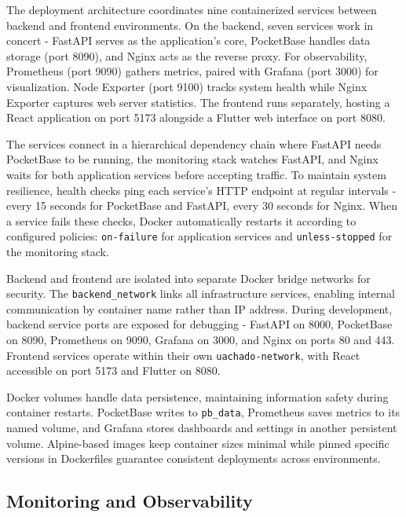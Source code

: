 The deployment architecture coordinates nine containerized services between backend and frontend environments. On the backend, seven services work in concert - FastAPI serves as the application's core, PocketBase handles data storage (port 8090), and Nginx acts as the reverse proxy. For observability, Prometheus (port 9090) gathers metrics, paired with Grafana (port 3000) for visualization. Node Exporter (port 9100) tracks system health while Nginx Exporter captures web server statistics. The frontend runs separately, hosting a React application on port 5173 alongside a Flutter web interface on port 8080.


The services connect in a hierarchical dependency chain where FastAPI needs PocketBase to be running, the monitoring stack watches FastAPI, and Nginx waits for both application services before accepting traffic. To maintain system resilience, health checks ping each service's HTTP endpoint at regular intervals - every 15 seconds for PocketBase and FastAPI, every 30 seconds for Nginx. When a service fails these checks, Docker automatically restarts it according to configured policies: \texttt{on-failure} for application services and \texttt{unless-stopped} for the monitoring stack.

Backend and frontend are isolated into separate Docker bridge networks for security. The \texttt{backend\_network} links all infrastructure services, enabling internal communication by container name rather than IP address. During development, backend service ports are exposed for debugging - FastAPI on 8000, PocketBase on 8090, Prometheus on 9090, Grafana on 3000, and Nginx on ports 80 and 443. Frontend services operate within their own \texttt{uachado-network}, with React accessible on port 5173 and Flutter on 8080.

Docker volumes handle data persistence, maintaining information safety during container restarts. PocketBase writes to \texttt{pb\_data}, Prometheus saves metrics to its named volume, and Grafana stores dashboards and settings in another persistent volume. Alpine-based images keep container sizes minimal while pinned specific versions in Dockerfiles guarantee consistent deployments across environments.

\subsection{Monitoring and Observability} \label{subsection:monitoring_observability}

